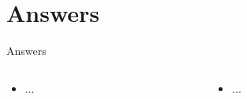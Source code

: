 \documentclass{beamer}
\begin{document}
\section{Answers}

\begin{frame}{Answers}
\tiny
\begin{columns}[T]
\begin{column}{0.5\textwidth}
\begin{itemize}
\item ...
\end{itemize}
\end{column}
\begin{column}{0.5\textwidth}
\begin{itemize}
\item ...
\end{itemize}
\end{column}
\end{columns}
\end{frame}
\end{document}
